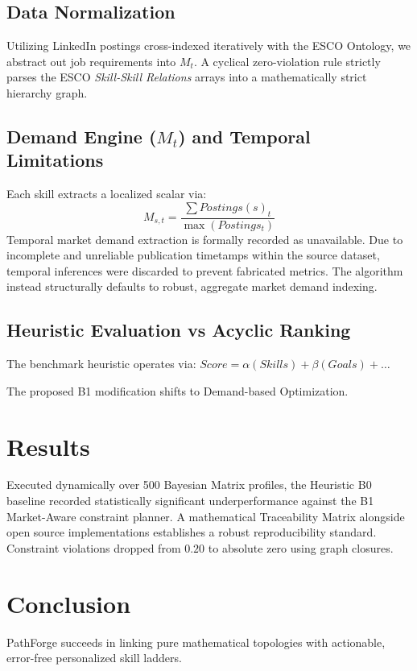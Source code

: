 \documentclass[conference]{IEEEtran}
\begin{document}
\subsection{Data Normalization}
Utilizing LinkedIn postings cross-indexed iteratively with the ESCO Ontology, we abstract out job requirements into $M_t$. A cyclical zero-violation rule strictly parses the ESCO \textit{Skill-Skill Relations} arrays into a mathematically strict hierarchy graph.

\subsection{Demand Engine ($M_t$) and Temporal Limitations}
Each skill extracts a localized scalar via:
\begin{equation}
M_{s,t} = \frac{\sum Postings(s)_{t}}{\max(Postings_{t})}
\end{equation}
Temporal market demand extraction is formally recorded as unavailable. Due to incomplete and unreliable publication timetamps within the source dataset, temporal inferences were discarded to prevent fabricated metrics. The algorithm instead structurally defaults to robust, aggregate market demand indexing.

\subsection{Heuristic Evaluation vs Acyclic Ranking}
The benchmark heuristic operates via:
$ Score = \alpha(Skills) + \beta(Goals) + \dots $

The proposed B1 modification shifts to Demand-based Optimization.

\section{Results}
Executed dynamically over 500 Bayesian Matrix profiles, the Heuristic B0 baseline recorded statistically significant underperformance against the B1 Market-Aware constraint planner. A mathematical Traceability Matrix alongside open source implementations establishes a robust reproducibility standard. Constraint violations dropped from $0.20$ to absolute zero using graph closures.

\section{Conclusion}
PathForge succeeds in linking pure mathematical topologies with actionable, error-free personalized skill ladders.
\end{document}
